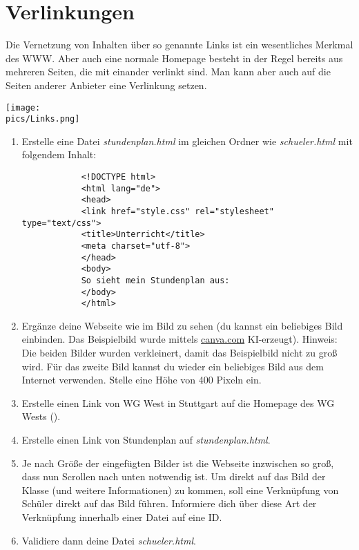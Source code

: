 \section{Verlinkungen}
Die Vernetzung von Inhalten über so genannte Links ist ein wesentliches Merkmal des WWW. Aber auch eine normale Homepage besteht in der Regel bereits aus mehreren Seiten, die mit einander verlinkt sind. Man kann aber auch auf die Seiten anderer Anbieter eine Verlinkung setzen.
\begin{minipage}[t]{\textwidth}
    \texttt{[image: \\pics/Links.png]}
\end{minipage}
\begin{Exercise}[title=, label=Links]
    \begin{enumerate}
        \item Erstelle eine Datei \textit{stundenplan.html} im gleichen Ordner wie \textit{schueler.html} mit folgendem Inhalt:
        \begin{lstlisting}
            <!DOCTYPE html>
            <html lang="de">
            <head>
            <link href="style.css" rel="stylesheet" type="text/css">
            <title>Unterricht</title>
            <meta charset="utf-8">
            </head>
            <body>
            So sieht mein Stundenplan aus:
            </body>
            </html>
        \end{lstlisting}
        \item Ergänze deine Webseite wie im Bild zu sehen (du kannst ein beliebiges Bild einbinden. Das Beispielbild wurde mittels \href{https://www.canva.com/}{canva.com} KI-erzeugt). Hinweis: Die beiden Bilder wurden verkleinert, damit das Beispielbild nicht zu groß wird.
        Für das zweite Bild kannst du wieder ein beliebiges Bild aus dem Internet verwenden. Stelle eine Höhe von 400 Pixeln ein.
        \item Erstelle einen Link von WG West in Stuttgart auf die Homepage des WG Wests ().
        \item Erstelle einen Link von Stundenplan auf \textit{stundenplan.html}.
        \item Je nach Größe der eingefügten Bilder ist die Webseite inzwischen so groß, dass nun Scrollen nach unten notwendig ist. Um direkt auf das Bild der Klasse (und weitere Informationen) zu kommen, soll eine Verknüpfung von Schüler direkt auf das Bild führen. Informiere dich über diese Art der Verknüpfung innerhalb einer Datei auf eine ID.
        \item Validiere dann deine Datei \textit{schueler.html}.
    \end{enumerate}
\end{Exercise}